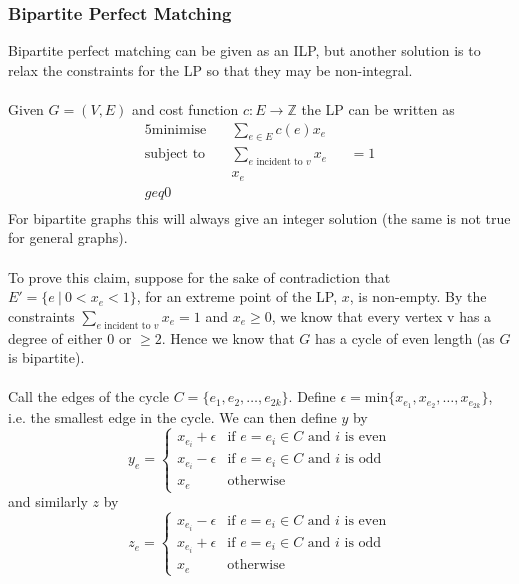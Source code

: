 \documentclass{article}
\theoremstyle{plain}
\theoremstyle{definition}
\begin{document}
        \subsubsection{Bipartite Perfect Matching}
            Bipartite perfect matching can be given as an ILP, but another solution is to relax the constraints for the LP so that they may be non-integral. \\ \\
            Given $G = (V, E)$ and cost function $c : E \to \mathbb{Z}$ the LP can be written as
            \begin{alignat*}{5}
            \text{minimise} &\quad \sum_{e \in E}c(e)x_e && \\
            \text{subject to} 
            &\quad \sum_{e \text{ incident to } v} x_e &&= 1  \tag{for each $v \in V$} \\
            &\quad  x_e &&\\geq 0 \tag{for each $e \in E$} \\
            \end{alignat*}
            For bipartite graphs this will always give an integer solution (the same is not true for general graphs). \\ \\
            To prove this claim, suppose for the sake of contradiction that $E' = \{e \ | \ 0 < x_e < 1\}$, for an extreme point of the LP, $x$, is non-empty. By the constraints $\sum_{e \text{ incident to } v} x_e = 1$ and $x_e \geq 0$, we know that every vertex v has a degree of either $0$ or $\geq 2$. Hence we know that $G$ has a cycle of even length (as $G$ is bipartite). \\ \\
            Call the edges of the cycle $C = \{e_1, e_2, \ldots, e_{2k} \}$. Define $\epsilon = \text{min} \{x_{e_1}, x_{e_2}, \ldots, x_{e_{2k}}\} $, i.e. the smallest edge in the cycle. We can then define $y$ by
            \[ y_e = 
               \begin{cases}
                    x_{e_i} + \epsilon & \text{if $e = e_i \in C$ and $i$ is even} \\ 
                    x_{e_i} - \epsilon & \text{if $e = e_i \in C$ and $i$ is odd} \\ 
                    x_{e} & \text{otherwise}
               \end{cases}
            \]
            and similarly $z$ by
            \[ z_e = 
               \begin{cases}
                    x_{e_i} - \epsilon & \text{if $e = e_i \in C$ and $i$ is even} \\ 
                    x_{e_i} + \epsilon & \text{if $e = e_i \in C$ and $i$ is odd} \\ 
                    x_{e} & \text{otherwise}
               \end{cases}
            \]
\end{document}
